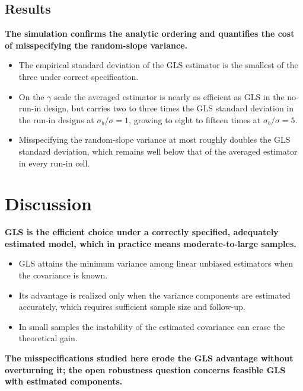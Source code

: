 \documentclass[
  11pt,
]{article}
\begin{document}
\subsection{Results}\label{results}

\textbf{The simulation confirms the analytic ordering and quantifies the cost of misspecifying the random-slope variance.}

\begin{itemize}\setlength{\itemsep}{2pt}\setlength{\parskip}{0pt}
\item The empirical standard deviation of the GLS estimator is the smallest of the three under correct specification.
\item On the $\gamma$ scale the averaged estimator is nearly as efficient as GLS in the no-run-in design, but carries two to three times the GLS standard deviation in the run-in designs at $\sigma_b/\sigma = 1$, growing to eight to fifteen times at $\sigma_b/\sigma = 5$.
\item Misspecifying the random-slope variance at most roughly doubles the GLS standard deviation, which remains well below that of the averaged estimator in every run-in cell.
\end{itemize}

\section{Discussion}\label{discussion}

\textbf{GLS is the efficient choice under a correctly specified, adequately estimated model, which in practice means moderate-to-large samples.}

\begin{itemize}\setlength{\itemsep}{2pt}\setlength{\parskip}{0pt}
\item GLS attains the minimum variance among linear unbiased estimators when the covariance is known.
\item Its advantage is realized only when the variance components are estimated accurately, which requires sufficient sample size and follow-up.
\item In small samples the instability of the estimated covariance can erase the theoretical gain.
\end{itemize}

\textbf{The misspecifications studied here erode the GLS advantage without overturning it; the open robustness question concerns feasible GLS with estimated components.}
\end{document}
